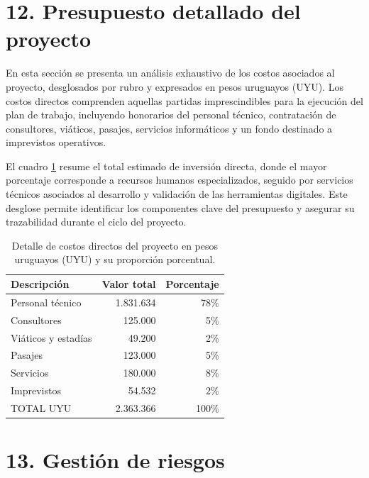 \documentclass[
11pt, %
]{charter}
\begin{document}
\section{12. Presupuesto detallado del proyecto}
\label{sec:presupuesto}
En esta sección se presenta un análisis exhaustivo de los costos asociados al proyecto, desglosados por rubro y expresados en pesos uruguayos (UYU). Los costos directos comprenden aquellas partidas imprescindibles para la ejecución del plan de trabajo, incluyendo honorarios del personal técnico, contratación de consultores, viáticos, pasajes, servicios informáticos y un fondo destinado a imprevistos operativos.

El cuadro \ref{tab:costos_directos} resume el total estimado de inversión directa, donde el mayor porcentaje corresponde a recursos humanos especializados, seguido por servicios técnicos asociados al desarrollo y validación de las herramientas digitales. Este desglose permite identificar los componentes clave del presupuesto y asegurar su trazabilidad durante el ciclo del proyecto.

\begin{table}[ht]
\caption{Detalle de costos directos del proyecto en pesos uruguayos (UYU) y su proporción porcentual.}
\label{tab:costos_directos}
\centering
\begin{tabular}{|p{6cm}|r|r|}
\hline
\rowcolor[HTML]{C0C0C0} 
\textbf{Descripción}       & \textbf{Valor total} & \textbf{Porcentaje} \\ \hline
Personal técnico           & 1.831.634 & 78\% \\ \hline
Consultores                &   125.000 & 5\%  \\ \hline
Viáticos y estadías        &    49.200 & 2\%  \\ \hline
Pasajes                    &   123.000 & 5\%  \\ \hline
Servicios                  &   180.000 & 8\%  \\ \hline
Imprevistos                &    54.532 & 2\%  \\ \hline
\rowcolor[HTML]{C0C0C0} 
TOTAL UYU                  & 2.363.366 & 100\% \\ \hline
\end{tabular}
\end{table}



\section{13. Gestión de riesgos}
\label{sec:riesgos}
\end{document}
